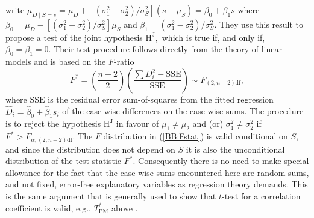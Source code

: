 \cite{BradBlack89} write $\mu_{D \mid S=s} = \mu_D + [ ( \sigma^2_1 - \sigma^2_2) / \sigma^2_S ] (s - \mu_S) = \beta_0 + \beta_1 s$ where $\beta_0=\mu_D- [(\sigma^2_1-\sigma^2_2)/ \sigma^2_S] \mu_S$ and $\beta_1 = (\sigma^2_1 - \sigma^2_2 )/ \sigma^2_S.$ They use this result to propose a test of the joint hypothesis $\textrm{H}^\mathrm{J},$ which is true if, and only if, $\beta_0=\beta_1=0.$ Their test procedure follows directly from the theory of linear models \citep[for example]{Hogg} and is based on the $F$-ratio
\begin{equation}\label{BB:Fstat}
F^* = (\frac{n-2}{2}) (\frac{\sum {D_i^2} - \mathrm{SSE}}{\mathrm{SSE}}) \sim F_{(2,n-2)\textrm{df}} ,
\end{equation}
where $\mathrm{SSE}$ is the residual error sum-of-squares from the fitted regression $\hat{D}_i=\hat{\beta}_0 +\hat{\beta}_1 s_i$ of the case-wise differences on the case-wise sums. The procedure is to reject the hypothesis $\textrm{H}^\mathrm{J}$ in favour of $\mu_1\neq\mu_2$ and (or) $\sigma^2_1\neq\sigma^2_2$ if $F^* >  F_{\alpha,(2,n-2)\textrm{df}}.$ The $F$ distribution in (\ref{BB:Fstat}) is valid conditional on $S,$ and since the distribution does not depend on $S$ it is also the unconditional distribution of the test statistic $F^*.$ Consequently there is no need to make special allowance for the fact that the case-wise sums encountered here are random sums, and not fixed, error-free explanatory variables as regression theory demands.   This is the same argument that is generally used to show that $t$-test for a correlation coefficient is valid, e.g., $T^*_\mathrm{PM}$ above \citep[page 499]{Hogg}.


